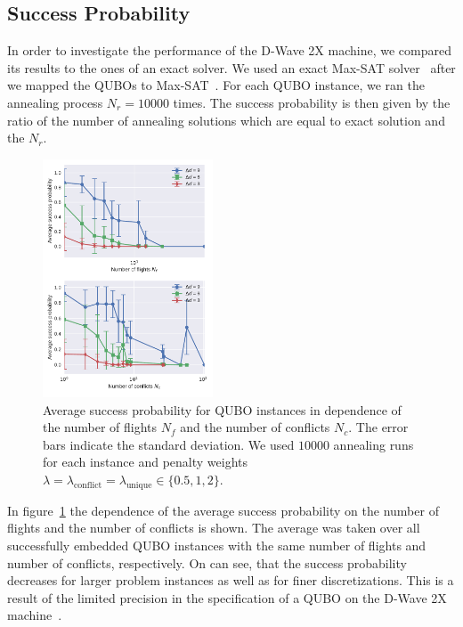 \subsection{Success Probability}
In order to investigate the performance of the D-Wave 2X machine, we compared its results to the ones of an exact solver.
We used an exact Max-SAT solver~\cite{TODO:akmaxsat} after we mapped the QUBOs to Max-SAT~\cite{TODO:reference-for-QUBO-to-MAXSAT-mapping}.
For each QUBO instance, we ran the annealing process $N_r = 10000$ times. 
The success probability is then given by the ratio of the number of annealing solutions which are equal to exact solution and the $N_r$.

\begin{figure}[htpb]
    \centering
    \includegraphics[width=0.45\textwidth]{./pics/annealing_results_success_vs_flights_and_conflicts.pdf}
    \caption{Average success probability for QUBO instances in dependence of the number of flights $N_f$ and the number of conflicts $N_c$. 
             The error bars indicate the standard deviation.
             We used $10000$ annealing runs for each instance and penalty weights $\lambda = \lambda_\text{conflict} = \lambda_\text{unique} \in \{0.5, 1, 2\}$. 
    }
\label{fig:success_probability}
\end{figure}

In figure~\ref{fig:success_probability} the dependence of the average success probability on the number of flights and the number of conflicts is shown.
The average was taken over all successfully embedded QUBO instances with the same number of flights and number of conflicts, respectively.
On can see, that the success probability decreases for larger problem instances as well as for finer discretizations. 
This is a result of the limited precision in the specification of a QUBO on the D-Wave 2X machine~\cite{TODO:D-Wave-precision}.

